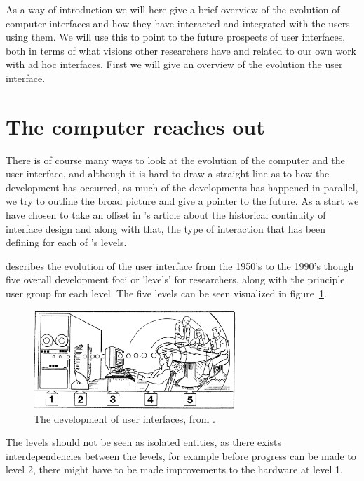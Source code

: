 
As a way of introduction we will here give a brief overview of the evolution of computer interfaces and how they have interacted and integrated with the users using them.
We will use this to point to the future prospects of user interfaces, both in terms of what visions other researchers have and related to our own work with ad hoc interfaces.
First we will give an overview of the evolution the user interface.
\section{The computer reaches out}
There is of course many ways to look at the evolution of the computer and the user interface, and although it is hard to draw a straight line as to how the development has occurred, as much of the developments has happened in parallel, we try to outline the broad picture and give a pointer to the future.
As a start we have chosen to take an offset in \citeauthor{grudin1990computer}'s article about the historical continuity of interface design \citep{grudin1990computer} and along with that, the type of interaction that has been defining for each of \citeauthor{grudin1990computer}'s levels.

\citeauthor{grudin1990computer} describes the evolution of the user interface from the 1950's to the 1990's though five overall development foci or 'levels' for researchers, along with the principle user group for each level.
The five levels can be seen visualized in figure~\ref{foci-interface}.

\begin{figure}[hb]
	\centering
  		\includegraphics[width=3in]{figures/foci-interface}
	\caption[The development of user interfaces \citep{grudin1990computer}.]
   {The development of user interfaces, from \citep{grudin1990computer}.}
   \label{foci-interface}
\end{figure}
The levels should not be seen as isolated entities, as there exists interdependencies between the levels, for example before progress can be made to level 2, there might have to be made improvements to the hardware at level 1.

